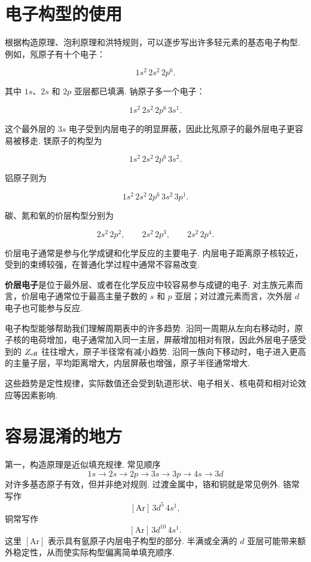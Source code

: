 \documentclass[UTF8,11pt,a4paper,openany]{ctexbook}
\newcommand{\term}[1]{\textbf{#1}}
\begin{document}
\section{电子构型的使用}

根据构造原理、泡利原理和洪特规则，可以逐步写出许多轻元素的基态电子构型. 例如，氖原子有十个电子：

\[
1s^2\,2s^2\,2p^6.
\]

其中 $1s$、$2s$ 和 $2p$ 亚层都已填满. 钠原子多一个电子：

\[
1s^2\,2s^2\,2p^6\,3s^1.
\]

这个最外层的 $3s$ 电子受到内层电子的明显屏蔽，因此比氖原子的最外层电子更容易被移走. 镁原子的构型为

\[
1s^2\,2s^2\,2p^6\,3s^2.
\]

铝原子则为

\[
1s^2\,2s^2\,2p^6\,3s^2\,3p^1.
\]

碳、氮和氧的价层构型分别为

\[
2s^2\,2p^2,\qquad
2s^2\,2p^3,\qquad
2s^2\,2p^4.
\]

价层电子通常是参与化学成键和化学反应的主要电子. 内层电子距离原子核较近，受到的束缚较强，在普通化学过程中通常不容易改变. 

\begin{definitionbox}
\term{价层电子}是位于最外层、或者在化学反应中较容易参与成键的电子. 对主族元素而言，价层电子通常位于最高主量子数的 $s$ 和 $p$ 亚层；对过渡元素而言，次外层 $d$ 电子也可能参与反应. 
\end{definitionbox}

电子构型能够帮助我们理解周期表中的许多趋势. 沿同一周期从左向右移动时，原子核的电荷增加，电子通常加入同一主层，屏蔽增加相对有限，因此外层电子感受到的 $Z_{\rm eff}$ 往往增大，原子半径常有减小趋势. 沿同一族向下移动时，电子进入更高的主量子层，平均距离增大，内层屏蔽也增强，原子半径通常增大. 

这些趋势是定性规律，实际数值还会受到轨道形状、电子相关、核电荷和相对论效应等因素影响. 

\section{容易混淆的地方}

\begin{limitbox}
第一，构造原理是近似填充规律. 常见顺序
\[
1s\to2s\to2p\to3s\to3p\to4s\to3d
\]
对许多基态原子有效，但并非绝对规则. 过渡金属中，铬和铜就是常见例外. 铬常写作
\[
[\mathrm{Ar}]\,3d^5\,4s^1,
\]
铜常写作
\[
[\mathrm{Ar}]\,3d^{10}\,4s^1.
\]
这里 $[\mathrm{Ar}]$ 表示具有氩原子内层电子构型的部分. 半满或全满的 $d$ 亚层可能带来额外稳定性，从而使实际构型偏离简单填充顺序. 
\end{limitbox}
\end{document}
